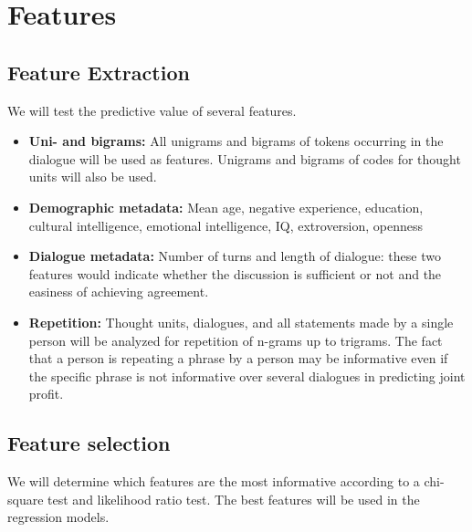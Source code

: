 \documentclass[11pt]{article} %
\begin{document}
\section{Features}
\subsection{Feature Extraction}  %
We will test the predictive value of several features.

\begin{itemize}
\item \textbf{Uni- and bigrams:} All unigrams and bigrams of tokens occurring in the dialogue will be used as features.  Unigrams and bigrams of codes for thought units will also be used.

\item \textbf{Demographic metadata:} Mean age, negative experience, education, cultural intelligence, emotional intelligence, IQ, extroversion, openness

\item \textbf{Dialogue metadata:} Number of turns and length of dialogue: these two features would indicate whether the discussion is sufficient or not and the easiness of achieving agreement.

\item \textbf{Repetition:} Thought units, dialogues, and all statements made by a single person will be analyzed for repetition of n-grams up to trigrams.  The fact that a person is repeating a phrase by a person may be informative even if the specific phrase is not informative over several dialogues in predicting joint profit.

\end{itemize}

\subsection{Feature selection}  %
We will determine which features are the most informative according to a chi-square test and likelihood ratio test.  The best features will be used in the regression models.
\end{document}
